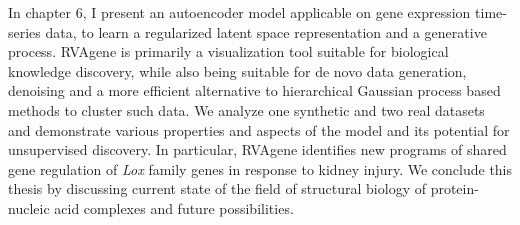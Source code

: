 In chapter 6, I present an autoencoder model applicable on gene expression time-series data, to learn a regularized latent
space representation and a generative process. RVAgene is primarily a visualization tool suitable for biological
knowledge discovery, while also being suitable for de novo data generation, denoising and a more
efficient alternative to hierarchical Gaussian process based methods to cluster such data. We
analyze one synthetic and two real datasets and demonstrate various properties and aspects of the
model and its potential for unsupervised discovery.  In particular, RVAgene identifies new programs of
shared gene regulation of \textit{Lox} family genes in response to kidney injury. We conclude this thesis by discussing current state of the field of structural biology of protein-nucleic acid complexes and future possibilities.
